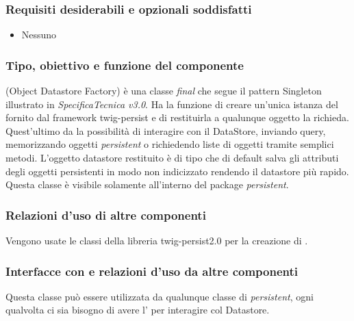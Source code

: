 \subsubsection*{Requisiti desiderabili e opzionali soddisfatti}
\begin{itemize}
    \item Nessuno
\end{itemize}
\subsubsection*{Tipo, obiettivo e funzione del componente}
 (Object Datastore Factory) \`e una classe \emph{final} che segue il
pattern Singleton illustrato in \emph{SpecificaTecnica v3.0}. Ha la funzione di creare un'unica istanza del
 fornito dal framework twig-persist e di restituirla a
qualunque oggetto la richieda. Quest'ultimo da la possibilit\`a di interagire con il DataStore, inviando query, memorizzando oggetti \emph{persistent} o richiedendo liste di oggetti
tramite semplici metodi. L'oggetto datastore restituito \`e di tipo
 che di default salva gli attributi degli oggetti
persistenti in modo non indicizzato rendendo il datastore pi\`u rapido.\\
Questa classe \`e visibile solamente all'interno del package \emph{persistent}.
\subsubsection*{Relazioni d'uso di altre componenti}
Vengono usate le classi della libreria twig-persist2.0 per la creazione di
.
\subsubsection*{Interfacce con e relazioni d'uso da altre componenti}
Questa classe pu\`o essere utilizzata da qualunque classe di \emph{persistent},
ogni qualvolta ci sia bisogno di avere l'  per interagire col
Datastore.
